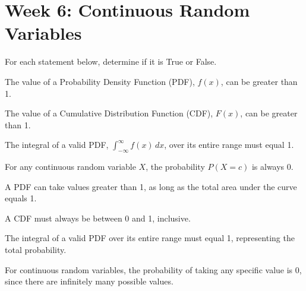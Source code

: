 \documentclass[a4paper, 10pt]{article}
\begin{document}
\subject[2110205 - Statistics for Computer Engineering]

\section{Week 6: Continuous Random Variables}

\begin{problem}
For each statement below, determine if it is True or False.
\begin{subproblems_alpha}
	\item The value of a Probability Density Function (PDF), \( f(x) \), can be greater than 1.
	\item The value of a Cumulative Distribution Function (CDF), \( F(x) \), can be greater than 1.
	\item The integral of a valid PDF, \( \displaystyle \int_{-\infty}^{\infty} f(x)\,dx \), over its entire range must equal 1.
	\item For any continuous random variable \( X \), the probability \( P(X = c) \) is always 0.
\end{subproblems_alpha}
\end{problem}

\begin{solution}
	\begin{subproblems_alpha}
		\item {} A PDF can take values greater than 1, as long as the total area under the curve equals 1.
		\item {} A CDF must always be between 0 and 1, inclusive.
		\item {} The integral of a valid PDF over its entire range must equal 1, representing the total probability.
		\item {} For continuous random variables, the probability of taking any specific value is 0, since there are infinitely many possible values.
	\end{subproblems_alpha}
\end{solution}
\end{document}
